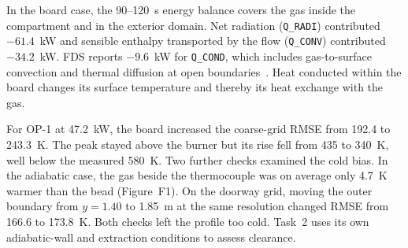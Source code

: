 In the board case, the 90--120~s energy balance covers the gas inside the compartment and in the exterior domain. Net radiation (\texttt{Q\_RADI}) contributed $-61.4$~kW and sensible enthalpy transported by the flow (\texttt{Q\_CONV}) contributed $-34.2$~kW. FDS reports $-9.6$~kW for \texttt{Q\_COND}, which includes gas-to-surface convection and thermal diffusion at open boundaries~\cite{fdsuser}. Heat conducted within the board changes its surface temperature and thereby its heat exchange with the gas.

For OP-1 at 47.2~kW, the board increased the coarse-grid RMSE from 192.4 to 243.3~K. The peak stayed above the burner but its rise fell from 435 to 340~K, well below the measured 580~K. Two further checks examined the cold bias. In the adiabatic case, the gas beside the thermocouple was on average only 4.7~K warmer than the bead (Figure~F1). On the doorway grid, moving the outer boundary from $y=1.40$ to 1.85~m at the same resolution changed RMSE from 166.6 to 173.8~K. Both checks left the profile too cold. Task~2 uses its own adiabatic-wall and extraction conditions to assess clearance.
